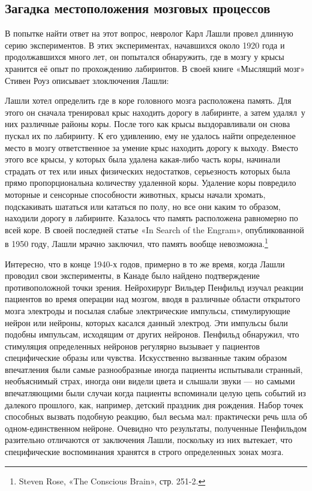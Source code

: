 \documentclass[../main.tex]{subfiles}
\begin{document}
\subsection{Загадка местоположения мозговых процессов}

В попытке найти ответ на этот вопрос, невролог Карл Лашли провел длинную серию экспериментов. В этих экспериментах, начавшихся около 1920 года и продолжавшихся много лет, он попытался обнаружить, где в мозгу у крысы хранится её опыт по прохождению лабиринтов. В своей книге «Мыслящий мозг» Стивен Роуз описывает злоключения Лашли:

Лашли хотел определить где в коре головного мозга расположена память. Для этого он сначала тренировал крыс находить дорогу в лабиринте, а затем удалял~у них различные районы коры. После того как крысы выздоравливали он снова пускал их по лабиринту. К его удивлению, ему не удалось найти определенное место в мозгу ответственное за умение крыс находить дорогу к выходу. Вместо этого все крысы, у которых была удалена какая-либо часть коры, начинали страдать от тех или иных физических недостатков, серьезность которых была прямо пропорциональна количеству удаленной коры. Удаление коры повредило моторные и сенсорные способности животных, крысы начали хромать, подскакивать шататься или кататься по полу, но все они каким то образом, находили дорогу в лабиринте. Казалось что память расположена равномерно по всей коре. В своей последней статье «In Search of the Engram», опубликованной в 1950 году, Лашли мрачно заключил, что память вообще невозможна.\footnote{Steven Rose, «The Conscious Brain», стр. 251-2.}

Интересно, что в конце 1940-х годов, примерно в то же время, когда Лашли проводил свои эксперименты, в Канаде было найдено подтверждение противоположной точки зрения. Нейрохирург Вильдер Пенфильд изучал реакции пациентов во время операции над мозгом, вводя в различные области открытого мозга электроды и посылая слабые электрические импульсы, стимулирующие нейрон или нейроны, которых касался данный электрод. Эти импульсы были подобны импульсам, исходящим от других нейронов. Пенфильд обнаружил, что стимуляция определенных нейронов регулярно вызывает у пациентов специфические образы или чувства. Искусственно вызванные таким образом впечатления были самые разнообразные иногда пациенты испытывали странный, необъяснимый страх, иногда они видели цвета и слышали звуки --- но самыми впечатляющими были случаи когда пациенты вспоминали целую цепь событий из далекого прошлого, как, например, детский праздник дня рождения. Набор точек способных вызвать подобную реакцию, был весьма мал: практически речь шла об одном-единственном нейроне. Очевидно что результаты, полученные Пенфильдом разительно отличаются от заключения Лашли, поскольку из них вытекает, что специфические воспоминания хранятся в строго определенных зонах мозга.
\end{document}
